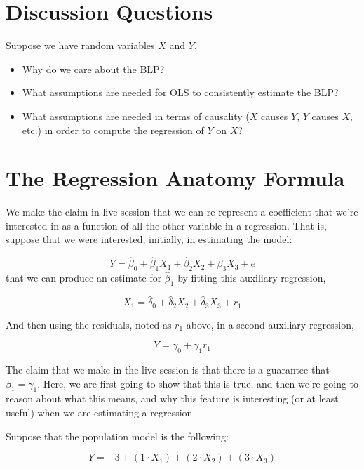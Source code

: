 \documentclass[
]{book}
\providecommand{\tightlist}{%
  \setlength{\itemsep}{0pt}\setlength{\parskip}{0pt}}
\theoremstyle{definition}
\theoremstyle{definition}
\theoremstyle{definition}
\theoremstyle{definition}
\theoremstyle{remark}
\begin{document}
\hypertarget{discussion-questions}{%
\section{Discussion Questions}\label{discussion-questions}}

Suppose we have random variables \(X\) and \(Y\).

\begin{itemize}
\tightlist
\item
  Why do we care about the BLP?
\item
  What assumptions are needed for OLS to consistently estimate the BLP?
\item
  What assumptions are needed in terms of causality (\(X\) causes \(Y\), \(Y\) causes \(X\), etc.) in order to compute the regression of \(Y\) on \(X\)?
\end{itemize}

\hypertarget{the-regression-anatomy-formula}{%
\section{The Regression Anatomy Formula}\label{the-regression-anatomy-formula}}

We make the claim in live session that we can re-represent a coefficient that we're interested in as a function of all the other variable in a regression. That is, suppose that we were interested, initially, in estimating the model:

\[ 
Y = \hat\beta_{0} + \hat\beta_{1} X_{1} + \hat\beta_{2} X_{2} + \hat\beta_{3}X_{3} + e
\]
that we can produce an estimate for \(\hat\beta_{1}\) by fitting this auxiliary regression,

\[
X_{1} = \hat\delta_{0} + \hat\delta_2X_2 + \hat\delta_3X_3 + r_{1}
\]

And then using the residuals, noted as \(r_1\) above, in a second auxiliary regression,

\[ 
Y = \gamma_0 + \gamma_1 r_1
\]

The claim that we make in the live session is that there is a guarantee that \(\beta_1 = \gamma_1\). Here, we are first going to show that this is true, and then we're going to reason about what this means, and why this feature is interesting (or at least useful) when we are estimating a regression.

Suppose that the population model is the following:

\[
Y = -3 + (1\cdot X_1) + (2\cdot X_2) + (3\cdot X_3)
\]
\end{document}
